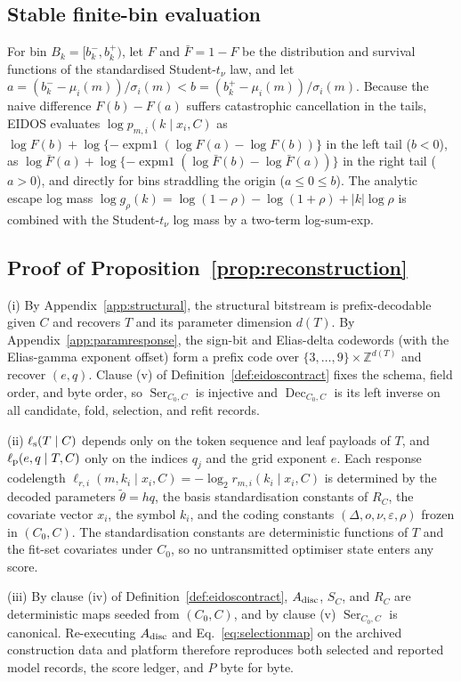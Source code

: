 \subsection{Stable finite-bin evaluation}\label{app:stablebins}

For bin \(B_k=[b_k^-,b_k^+)\), let \(F\) and \(\bar F=1-F\) be the distribution and survival functions of the standardised Student-\(t_\nu\) law, and let \(a=(b_k^--\mu_i(m))/\sigma_i(m)<b=(b_k^+-\mu_i(m))/\sigma_i(m)\). Because the naive difference \(F(b)-F(a)\) suffers catastrophic cancellation in the tails, EIDOS evaluates \(\log p_{m,i}(k\mid x_i,C)\) as \(\log F(b)+\log\{-\operatorname{expm1}(\log F(a)-\log F(b))\}\) in the left tail (\(b<0\)), as \(\log\bar F(a)+\log\{-\operatorname{expm1}(\log\bar F(b)-\log\bar F(a))\}\) in the right tail (\(a>0\)), and directly for bins straddling the origin (\(a\le0\le b\)). The analytic escape log mass \(\log g_\rho(k)=\log(1-\rho)-\log(1+\rho)+|k|\log\rho\) is combined with the Student-\(t_\nu\) log mass by a two-term log-sum-exp.

\subsection{Proof of Proposition~\ref{prop:reconstruction}}\label{app:proofreconstruction}

\begin{pf}
(i) By Appendix~\ref{app:structural}, the structural bitstream is prefix-decodable given \(C\) and recovers \(T\) and its parameter dimension \(d(T)\). By Appendix~\ref{app:paramresponse}, the sign-bit and Elias-delta codewords (with the Elias-gamma exponent offset) form a prefix code over \(\{3,\ldots,9\}\times\mathbb Z^{d(T)}\) and recover \((e,q)\). Clause (v) of Definition~\ref{def:eidoscontract} fixes the schema, field order, and byte order, so \(\operatorname{Ser}_{C_0,C}\) is injective and \(\operatorname{Dec}_{C_0,C}\) is its left inverse on all candidate, fold, selection, and refit records.

(ii) \(\ell_{\rm s}(T\mid C)\) depends only on the token sequence and leaf payloads of \(T\), and \(\ell_{\rm p}(e,q\mid T,C)\) only on the indices \(q_j\) and the grid exponent \(e\). Each response codelength \(\ell_{r,i}(m,k_i\mid x_i,C)=-\log_2 r_{m,i}(k_i\mid x_i,C)\) is determined by the decoded parameters \(\widetilde\theta=hq\), the basis standardisation constants of \(R_C\), the covariate vector \(x_i\), the symbol \(k_i\), and the coding constants \((\Delta,o,\nu,\varepsilon,\rho)\) frozen in \((C_0,C)\). The standardisation constants are deterministic functions of \(T\) and the fit-set covariates under \(C_0\), so no untransmitted optimiser state enters any score.

(iii) By clause (iv) of Definition~\ref{def:eidoscontract}, \(A_{\rm disc}\), \(S_C\), and \(R_C\) are deterministic maps seeded from \((C_0,C)\), and by clause (v) \(\operatorname{Ser}_{C_0,C}\) is canonical. Re-executing \(A_{\rm disc}\) and Eq.~\eqref{eq:selectionmap} on the archived construction data and platform therefore reproduces both selected and reported model records, the score ledger, and \(P\) byte for byte.
\end{pf}

